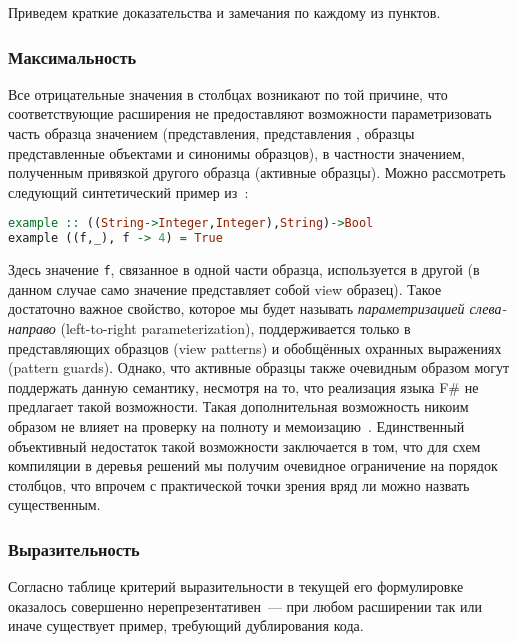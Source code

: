 Приведем краткие доказательства и замечания по каждому из \mbox{пунктов}.

\subsubsection{Максимальность}

Все отрицательные значения в столбцах возникают по той причине, что соответствующие расширения не предоставляют возможности параметризовать часть образца значением (представления, представления \SML, образцы представленные объектами и синонимы образцов), в частности значением, полученным привязкой другого образца (активные образцы). Можно рассмотреть следующий синтетический пример из~\cite{viewshaskell}:

\noindent
\begin{minipage}{\linewidth}
\begin{lstlisting}[language=haskell, escapechar=@]
example :: ((String->Integer,Integer),String)->Bool
example ((f,_), f -> 4) = True
\end{lstlisting}
\end{minipage}

Здесь значение \lstinline|f|, связанное в одной части образца, используется в другой (в данном случае само значение представляет собой view образец). Такое достаточно важное свойство, которое мы будет называть \textit{параметризацией слева-направо} (left-to-right parameterization), поддерживается только в представляющих образцов (view patterns) и обобщённых охранных выражениях (pattern guards). Однако, что активные образцы также очевидным образом могут поддержать данную семантику, несмотря на то, что реализация языка F\# не предлагает такой возможности. Такая дополнительная возможность никоим образом не влияет на проверку на полноту и мемоизацию~\cite{okasaki98views}. Единственный объективный недостаток такой возможности заключается в том, что для схем компиляции в деревья решений мы получим очевидное ограничение на порядок столбцов, что впрочем с практической точки зрения вряд ли можно назвать существенным.

\subsubsection{Выразительность}

Согласно таблице критерий выразительности в текущей его формулировке оказалось совершенно нерепрезентативен~--- при любом расширении так или иначе существует пример, требующий дублирования кода.

